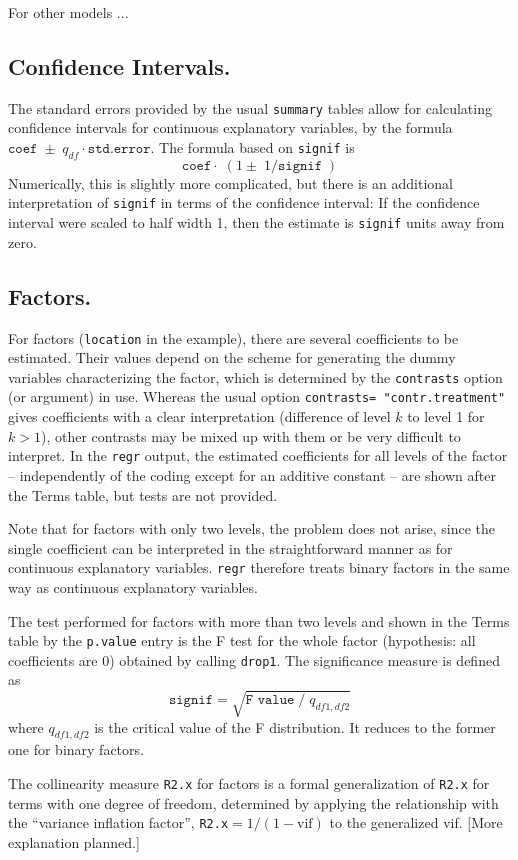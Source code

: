\documentclass{article}
\providecommand{\T}{\texttt}
\providecommand{\Hneed}[1]{\penalty-8000\hskip#1 plus10pt\penalty-8000\hskip-#1}
\begin{document}
For other models ...

\subsection{Confidence Intervals.}
The standard errors provided by the usual \T{summary} tables allow for
calculating confidence intervals for continuous explanatory variables,
by the formula $\T{coef} \;\pm\; q_{df}\cdot\T{std.error}$.
The formula based on \T{signif} is
\[
  \T{coef}\cdot\;(1\pm\;1/\T{signif}\;)
\]
Numerically, this is slightly more complicated, but there is an additional
interpretation of \T{signif} in terms of the confidence interval:
If the confidence interval were scaled to half width 1, then 
the estimate is \T{signif} units away from zero.

\subsection{Factors.}
For factors (\T{location} in the example), there are several coefficients
to be estimated. Their values depend on the scheme for generating the 
dummy variables characterizing the factor, which is determined 
by the \T{contrasts} option (or argument) in use.
Whereas the usual option %
\T{contrasts=%
"contr.treatment"} gives coefficients
with a clear interpretation (difference of level $k$ to level 1 for $k>1$),
other contrasts may be mixed up with them or be very difficult to
interpret.
In the \T{regr} output, the estimated coefficients for all levels of the
factor -- independently of the coding except for an additive constant --
are shown after the Terms table, but tests are not provided. 

Note that for factors with only two levels, the problem does not arise,
since the single 
coefficient can be interpreted in the straightforward manner as 
for continuous explanatory variables. \T{regr} therefore treats binary
factors in the same way as continuous explanatory variables.

The test performed for factors with more than two levels and shown in the
Terms table by the \T{p.value} entry is the F test for the whole factor 
(hypothesis: all coefficients are 0) obtained by calling \T{drop1}.
The significance measure is defined as 
\[
  \T{signif} = \sqrt{\T{F value}\;/\;q_{df1,df2}}
\]
where $q_{df1,df2}$ is the critical value of the F distribution.
It reduces to the former one for binary factors.

The collinearity measure \T{R2.x} for factors is a formal generalization of 
\T{R2.x} for terms with one degree of freedom, determined by applying
the relationship with the ``variance inflation factor'',
\T{R2.x}$=1/(1-\mbox{vif})$ to the generalized vif. 
[More explanation planned.]
\end{document}
